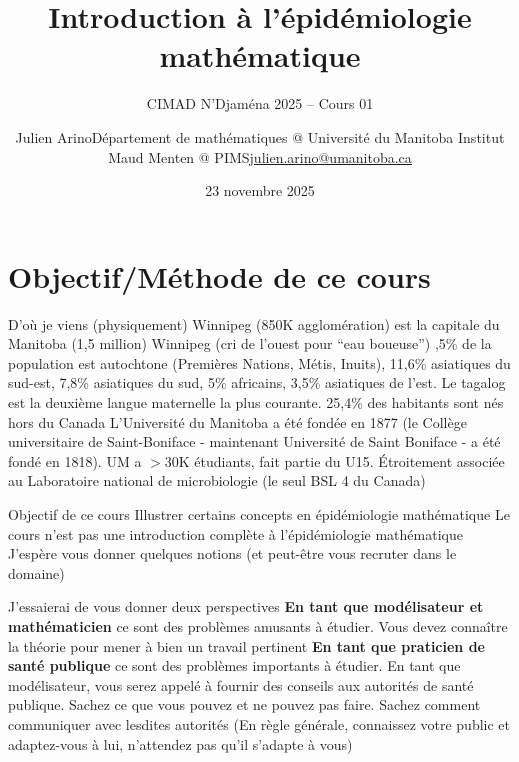 \documentclass[aspectratio=169]{beamer}\usepackage[]{graphicx}\usepackage[]{xcolor}
\title{Introduction à l'épidémiologie mathématique}
\subtitle{CIMAD N'Djaména 2025 -- Cours 01}
\date{23 novembre 2025}
\author{\texorpdfstring{Julien Arino\newline Département de mathématiques @ Université du Manitoba \newline Institut Maud Menten @ PIMS\newline\url{julien.arino@umanitoba.ca}}{Julien Arino}}
\begin{document}


\section*{Objectif/Méthode de ce cours}


\begin{frame}{D'où je viens (physiquement)}
\bbullet Winnipeg (850K agglomération) est la capitale du Manitoba (1,5 million)
\vfill
\bbullet Winnipeg (cri de l'ouest pour ``eau boueuse'')
\vfill
{},5\% de la population est autochtone (Premières Nations, Métis, Inuits), 11,6\% asiatiques du sud-est, 7,8\% asiatiques du sud, 5\% africains, 3,5\% asiatiques de l'est. Le tagalog est la deuxième langue maternelle la plus courante. 25,4\% des habitants sont nés hors du Canada
\vfill
\bbullet L'Université du Manitoba a été fondée en 1877 (le Collège universitaire de Saint-Boniface - maintenant Université de Saint Boniface - a été fondé en 1818). UM a $>$30K étudiants, fait partie du U15. Étroitement associée au Laboratoire national de microbiologie (le seul BSL 4 du Canada)
\end{frame}


\begin{frame}{Objectif de ce cours}
\bbullet
Illustrer certains concepts en épidémiologie mathématique
\vfill
\bbullet Le cours n'est pas une introduction complète à l'épidémiologie mathématique
\vfill
\bbullet J'espère vous donner quelques notions (et peut-être vous recruter dans le domaine)
\end{frame}

\begin{frame}{J'essaierai de vous donner deux perspectives}
\bbullet\textbf{En tant que modélisateur et mathématicien} ce sont des problèmes amusants à étudier. Vous devez connaître la théorie pour mener à bien un travail pertinent
\vfill
\bbullet\textbf{En tant que praticien de santé publique} ce sont des problèmes importants à étudier.
En tant que modélisateur, vous serez appelé à fournir des conseils aux autorités de santé publique. Sachez ce que vous pouvez et ne pouvez pas faire. Sachez comment communiquer avec lesdites autorités
\vfill
(En règle générale, connaissez votre public et adaptez-vous à lui, n'attendez pas qu'il s'adapte à vous)
\end{frame}
\end{document}
